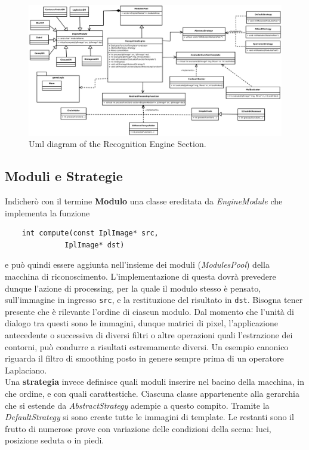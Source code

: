 \documentclass[a4paper,10pt, twocolumn]{article}
\begin{document}
  \begin{figure}[p]
     \centering
    \caption{Uml diagram of the Recognition Engine Section.}
    \label{recognitionEngineDiagram}
    \includegraphics[angle=90, scale=0.5]{UmlDiagrams/recognitionEngine.pdf}
  \end{figure}

  \subsection{Moduli e Strategie}
  Indicher\`{o}
  con il termine \textbf{Modulo} una classe ereditata da \textit{EngineModule} 
  che implementa la funzione
  
  \begin{center}
    \begin{verbatim}
    int compute(const IplImage* src, 
		      IplImage* dst)
    \end{verbatim}
  \end{center}
   e pu\`{o} quindi essere aggiunta nell'insieme dei moduli (\textit{ModulesPool})
  della macchina di riconoscimento.
  L'implementazione di questa dovr\`{a} prevedere dunque l'azione di processing, 
  per la quale il modulo stesso 
  \`{e} pensato, sull'immagine in ingresso \texttt{src}, e la restituzione del risultato in
  \texttt{dst}.
  Bisogna tener presente che \`{e} rilevante l'ordine di ciascun modulo.
  Dal momento che l'unit\`{a} di dialogo tra questi sono le immagini, dunque matrici
  di pixel, l'applicazione antecedente o successiva di diversi filtri o altre operazioni quali
  l'estrazione
  dei contorni, pu\`{o} condurre a risultati estremamente diversi. Un esempio canonico
  riguarda il filtro di smoothing posto in genere sempre prima di un operatore Laplaciano.\\
  Una \textbf{strategia} invece definisce quali moduli inserire nel bacino della macchina,
  in che ordine, e con quali carattestiche. Ciascuna classe appartenente alla gerarchia
  che si estende da \textit{AbstractStrategy} adempie a questo compito. Tramite la 
  \textit{DefaultStrategy} si sono create tutte le immagini di template.
  Le restanti sono il frutto di numerose prove con variazione delle condizioni 
  della scena: luci, posizione seduta o in piedi.  
  
\end{document}
